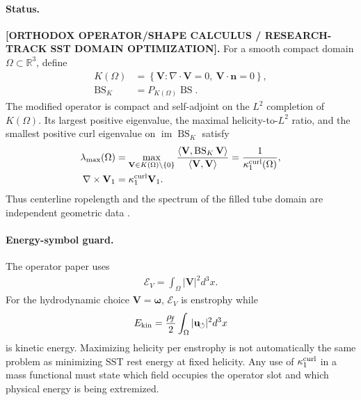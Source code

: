 \paragraph{Status.}
\textbf{[ORTHODOX OPERATOR/SHAPE CALCULUS / RESEARCH-TRACK SST DOMAIN OPTIMIZATION].}
For a smooth compact domain $\Omega\subset\mathbb R^3$, define
\begin{align}
    K(\Omega)
    &=
    \left\{
        \mathbf V:\nabla\cdot\mathbf V=0,
        \ \mathbf V\cdot\mathbf n=0
    \right\},\\
    \operatorname{BS}_{K}
    &=
    P_{K(\Omega)}\operatorname{BS} .
    \label{eq:rt_isoperimetric_projected_bs}
\end{align}
The modified operator is compact and self-adjoint on the $L^2$ completion of
$K(\Omega)$.  Its largest positive eigenvalue, the maximal helicity-to-$L^2$
ratio, and the smallest positive curl eigenvalue on
$\operatorname{im}\operatorname{BS}_{K}$ satisfy
\begin{align}
    \lambda_{\max}(\Omega)
    &=
    \max_{\mathbf V\in K(\Omega)\setminus\{0\}}
    \frac{\langle\mathbf V,
    \operatorname{BS}_{K}\mathbf V\rangle}
    {\langle\mathbf V,\mathbf V\rangle}
    =
    \frac{1}{\kappa_{1}^{\rm curl}(\Omega)},
    \label{eq:rt_isoperimetric_equivalent_problems}\\
    \nabla\times\mathbf V_1
    &=
    \kappa_{1}^{\rm curl}\mathbf V_1 .
    \label{eq:rt_isoperimetric_beltrami_field}
\end{align}
Thus centerline ropelength and the spectrum of the filled tube domain are
independent geometric data \cite{CantarellaDeTurckGluckTeytel2000Isoperimetric}.

\paragraph{Energy-symbol guard.}
The operator paper uses
\begin{align}
    \mathscr E_V
    =
    \int_{\Omega}|\mathbf V|^2d^3x .
    \label{eq:rt_isoperimetric_l2_energy}
\end{align}
For the hydrodynamic choice $\mathbf V=\boldsymbol\omega$,
$\mathscr E_V$ is enstrophy while
\begin{align}
    E_{\rm kin}
    =
    \frac{\rho_{\!f}}{2}\int_{\Omega}|\mathbf{u}_{\!\boldsymbol{\circlearrowleft}}|^2d^3x
    \label{eq:rt_isoperimetric_kinetic_energy_guard}
\end{align}
is kinetic energy.  Maximizing helicity per enstrophy is not automatically the
same problem as minimizing SST rest energy at fixed helicity.  Any use of
$\kappa_1^{\rm curl}$ in a mass functional must state which field occupies the
operator slot and which physical energy is being extremized.

